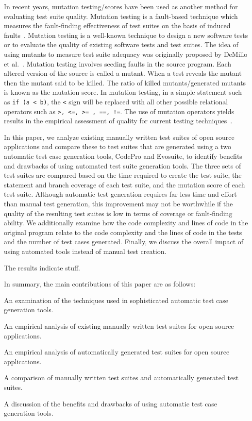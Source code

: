 In recent years, mutation testing/scores have been used as another method for evaluating test suite quality. Mutation testing is a fault-based technique which measures the fault-finding effectiveness of test suites on the basis of induced faults~\cite{demillo1978hints, hamlet1977testing}. Mutation testing is a well-known technique to design a new software tests or to evaluate the quality of existing software tests and test suites. The idea of using mutants to measure test suite adequacy was originally proposed by DeMillo et al.~\cite{demillo1978hints}. Mutation testing involves seeding faults in the source program. Each altered version of the source is called a mutant. When a test reveals the mutant then the mutant said to be killed. The ratio of killed mutants/generated mutants is known as the mutation score. In mutation testing, in a simple statement such as  \texttt{if (a < b)}, the \texttt{<} sign will be replaced with all other possible relational operators such as \texttt{>, <=, >= , ==, !=}. The use of mutation operators yields results in the empirical assessment of quality for current testing techniques~\cite{andrews2005mutation}.  

In this paper, we analyze existing manually written test suites of open source applications and compare these to test suites that are generated using a two automatic test case generation tools, CodePro and Evosuite, to identify benefits and drawbacks of using automated test suite generation tools.  The three sets of test suites are compared based on the time required to create the test suite, the statement and branch coverage of each test suite, and the mutation score of each test suite.  Although automatic test generation requires far less time and effort than manual test generation, this improvement may not be worthwhile if the quality of the resulting test suites is low in terms of coverage or fault-finding ability.  We additionally examine how the code complexity and lines of code in the original program relate to the code complexity and the lines of code in the tests and the number of test cases generated. Finally, we discuss the overall impact of using automated tools instead of manual test creation.

The results indicate stuff.

In summary, the main contributions of this paper are as follows:
\squishlist 
\item An examination of the techniques used in sophisticated automatic test case generation tools.
\item An empirical analysis of existing manually written test suites for open source applications.
\item An empirical analysis of automatically generated test suites for open source applications.
\item A comparison of manually written test suites and automatically generated test suites.
\item A discussion of the benefits and drawbacks of using automatic test case generation tools.
\squishend 

